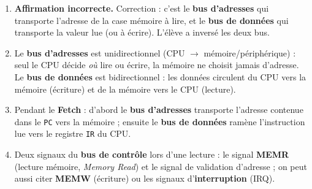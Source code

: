 \documentclass[11pt]{article}
\newcommand{\cle}[1]{{\popxbold\color{popdark}#1}}
\begin{document}
\begin{corrige}
\begin{enumerate}
    \item \textbf{Affirmation incorrecte.} Correction : c'est le \textbf{bus d'adresses} qui transporte l'adresse de la case mémoire à lire, et le \textbf{bus de données} qui transporte la valeur lue (ou à écrire). L'élève a inversé les deux bus.
    \item Le \textbf{bus d'adresses} est \cle{unidirectionnel} (CPU $\to$ mémoire/périphérique) : seul le CPU décide \emph{où} lire ou écrire, la mémoire ne choisit jamais d'adresse. Le \textbf{bus de données} est \cle{bidirectionnel} : les données circulent du CPU vers la mémoire (écriture) et de la mémoire vers le CPU (lecture).
    \item Pendant le \textbf{Fetch} : d'abord le \textbf{bus d'adresses} transporte l'adresse contenue dans le \texttt{PC} vers la mémoire ; ensuite le \textbf{bus de données} ramène l'instruction lue vers le registre \texttt{IR} du CPU.
    \item Deux signaux du \textbf{bus de contrôle} lors d'une lecture : le signal \textbf{MEMR} (lecture mémoire, \emph{Memory Read}) et le signal de validation d'adresse ; on peut aussi citer \textbf{MEMW} (écriture) ou les signaux d'\textbf{interruption} (IRQ).
\end{enumerate}
\end{corrige}
\end{document}
